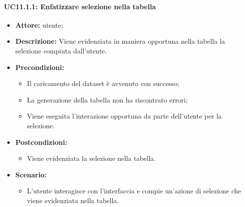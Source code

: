 \paragraph{UC11.1.1: Enfatizzare selezione nella tabella}
\begin{itemize}    
    \item \textbf{Attore:} utente;
    \item \textbf{Descrizione:} Viene evidenziata in maniera opportuna nella tabella la selezione compiuta dall'utente.
    \item \textbf{Precondizioni:}    
        \begin{itemize}
            \item Il caricamento del dataset è avvenuto con successo;
            \item La generazione della tabella non ha riscontrato errori;
            \item Viene eseguita l'interazione opportuna da parte dell'utente per la selezione.
        \end{itemize}    
    \item \textbf{Postcondizioni:}
        \begin{itemize}
            \item Viene evidenziata la selezione nella tabella.
        \end{itemize}    
    \item \textbf{Scenario:} 
        \begin{itemize}
            \item L'utente interagisce con l'interfaccia e compie un'azione di selezione che viene evidenziata nella tabella.
        \end{itemize}
\end{itemize}

\pagebreak

